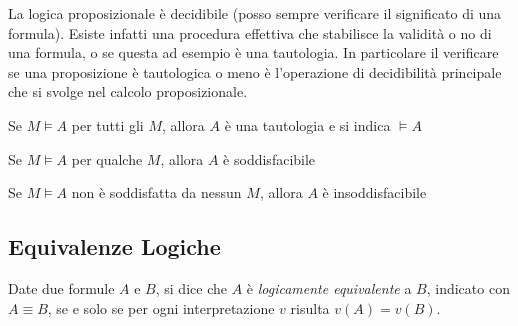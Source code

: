 \documentclass[a4paper,12pt, oneside]{book}
\begin{document}
La logica proposizionale è decidibile (posso sempre verificare il significato di
una formula). 
Esiste infatti una procedura effettiva che stabilisce la validità o no di una
formula, o se questa 
ad esempio è una tautologia.
In particolare il verificare se una proposizione è tautologica o meno è
l’operazione di decidibilità principale che si svolge nel calcolo
proposizionale. 

\begin{definizione}
  Se $M \models A$ per tutti gli $M$, allora $A$ è una tautologia e si indica
  $\models A$ 
\end{definizione}

\begin{definizione}
  Se $M \models A$ per qualche $M$, allora $A$ è soddisfacibile
\end{definizione}

\begin{definizione}
  Se $M \models A$ non è soddisfatta da nessun $M$, allora $A$ è
  insoddisfacibile 
\end{definizione}
\subsection{Equivalenze Logiche}
\begin{defi}
  Date due formule $A$ e $B$, si dice che $A$ è \emph{logicamente equivalente} a
  $B$, 
  indicato con $A \equiv B$, se e solo se per ogni interpretazione $v$ risulta
  $v(A) = v(B)$. 
\end{defi}
\end{document}
